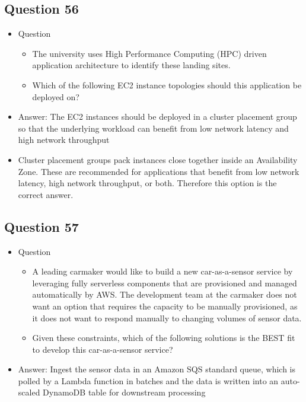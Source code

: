 \documentclass[]{scrartcl}
\begin{document}
\subsection{Question 56}
\begin{itemize}
	\item Question
	\begin{itemize}
		\item The university uses High Performance Computing (HPC) driven application architecture to identify these landing sites.
		\item Which of the following EC2 instance topologies should this application be deployed on?
	\end{itemize}
	\item Answer: The EC2 instances should be deployed in a cluster placement group so that the underlying workload can benefit from low network latency and high network throughput
	\item Cluster placement groups pack instances close together inside an Availability Zone. These are recommended for applications that benefit from low network latency, high network throughput, or both. Therefore this option is the correct answer.
\end{itemize}

\subsection{Question 57}
\begin{itemize}
	\item Question
	\begin{itemize}
		\item A leading carmaker would like to build a new car-as-a-sensor service by leveraging fully serverless components that are provisioned and managed automatically by AWS. The development team at the carmaker does not want an option that requires the capacity to be manually provisioned, as it does not want to respond manually to changing volumes of sensor data.
		\item Given these constraints, which of the following solutions is the BEST fit to develop this car-as-a-sensor service?
	\end{itemize}
	\item Answer: Ingest the sensor data in an Amazon SQS standard queue, which is polled by a Lambda function in batches and the data is written into an auto-scaled DynamoDB table for downstream processing
\end{itemize}
\end{document}
